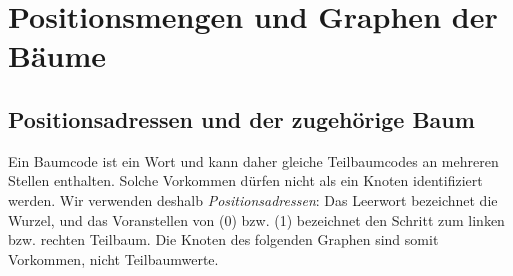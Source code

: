 \documentclass[main.tex]{subfiles}
\begin{document}
\noindent\begin{minipage}{\linewidth}
\end{minipage}\par







\chapter{Positionsmengen und Graphen der Bäume}

\section{Positionsadressen und der zugehörige Baum}

Ein Baumcode ist ein Wort und kann daher gleiche Teilbaumcodes an mehreren
Stellen enthalten. Solche Vorkommen dürfen nicht als ein Knoten
identifiziert werden. Wir verwenden deshalb \emph{Positionsadressen}: Das
Leerwort bezeichnet die Wurzel, und das Voranstellen von (0) bzw. (1)
bezeichnet den Schritt zum linken bzw. rechten Teilbaum. Die Knoten des
folgenden Graphen sind somit Vorkommen, nicht Teilbaumwerte.

\end{document}
